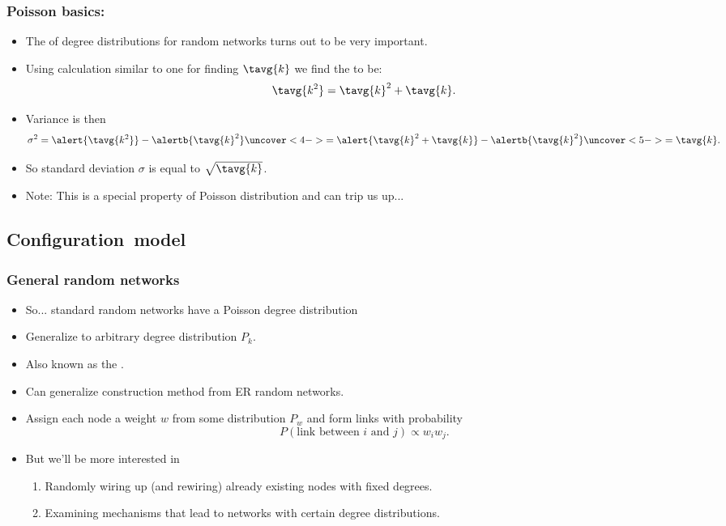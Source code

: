 \begin{frame}[label=]
  \frametitle{Poisson basics:}

    \begin{itemize}
    \item<1-> The  of degree distributions
      for random networks turns out to be \alert{very important}.
    \item<2-> Using calculation similar to one for finding $\tavg{k}$
      we find the  to be:
      $$
      \tavg{k^2} = \tavg{k}^2 + \tavg{k}.
      $$
    \item<3-> 
      Variance is then
      $$
      \sigma^2 = \alert{\tavg{k^2}} - \alertb{\tavg{k}^2} 
      \uncover<4->{
        = 
        \alert{\tavg{k}^2 + \tavg{k}} - \alertb{\tavg{k}^2}
      }
      \uncover<5->{
        = 
        \tavg{k}.
      }
      $$
    \item<6->
      So standard deviation $\sigma$ is equal to $\sqrt{\tavg{k}}$.
    \item<7->
      Note: This is a special property of Poisson distribution 
      and can trip us up...
    \end{itemize}

\end{frame}

\subsection{Configuration\ model}

\begin{frame}[label=]
  \frametitle{General random networks}

  \begin{itemize}
  \item<1->
    So... standard random networks have a Poisson degree distribution
  \item<2->
    Generalize to arbitrary degree distribution $P_k$.
  \item<3->
    Also known as the .\cite{newman2003a}
  \item<4->
    Can generalize construction method from ER random networks.
  \item<5->
    Assign each node a weight $w$ from some distribution $P_w$
    and form links with probability
    $$ P(\mbox{link between $i$ and $j$}) \propto w_i w_j.$$
  \item<6->
    But we'll be more interested in 
    \begin{enumerate}
    \item<7->
      Randomly wiring up (and rewiring) already existing nodes
      with fixed degrees.
    \item<8->
      Examining mechanisms that lead to networks with
      certain degree distributions.
    \end{enumerate}
  \end{itemize}

\end{frame}

